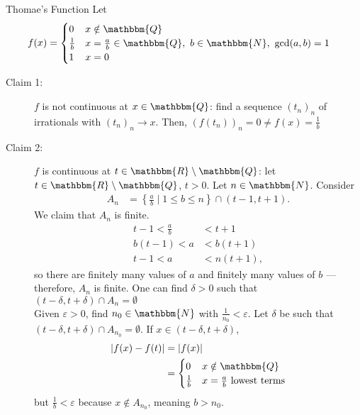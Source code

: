 \documentclass[10pt]{extarticle}
\newcommand{\N}{\mathbbm{N}}
\newcommand{\Q}{\mathbbm{Q}}
\newcommand{\R}{\mathbbm{R}}
\begin{document}
  \begin{problem}{Thomae's Function}
    Let
    \begin{align*}
      f(x) &= \begin{cases}
        0 & x\notin \Q\\
        \frac{1}{b} & x = \frac{a}{b}\in\Q,~b\in\N,~\text{gcd}(a,b)=1\\
        1 & x = 0
      \end{cases}
    \end{align*}
    \tcblower
    \begin{description}
      \item[Claim 1:] $f$ is not continuous at $x\in\Q$: find a sequence $(t_n)_n$ of irrationals with $(t_n)_n \rightarrow x$. Then, $(f(t_n))_n = 0\neq f(x) = \frac{1}{b}$
      \item[Claim 2:] $f$ is continuous at $t\in \R\setminus\Q$: let $t\in \R\setminus\Q$, $t > 0$. Let $n\in\N$. Consider
        \begin{align*}
          A_n &= \left\{\frac{a}{b} \mid 1 \leq b\leq n\right\} \cap (t-1,t+1).
        \end{align*}
        We claim that $A_n$ is finite.
        \begin{align*}
          t-1 < \frac{a}{b} &< t+1\\
          b(t-1) < a &< b(t+1)\\
          t-1 < a &< n(t+1),
        \end{align*}
        so there are finitely many values of $a$ and finitely many values of $b$ --- therefore, $A_n$ is finite. One can find $\delta > 0$ such that $(t-\delta,t+\delta) \cap A_n = \emptyset$\\

        Given $\varepsilon > 0$, find $n_{0}\in \N$ with $\frac{1}{n_0} < \varepsilon$. Let $\delta$ be such that $(t-\delta,t+\delta) \cap A_{n_0} = \emptyset$. If $x\in (t-\delta,t+\delta)$,
        \begin{align*}
          |f(x) - f(t)| &= |f(x)|\\
                        &= \begin{cases}
                          0 & x\notin\Q\\
                          \frac{1}{b} & x = \frac{a}{b}~\text{lowest terms}
                        \end{cases}
        \end{align*}
        but $\frac{1}{b} < \varepsilon$ because $x\notin A_{n_0}$, meaning $b > n_0$.
    \end{description}
  \end{problem}
\end{document}
